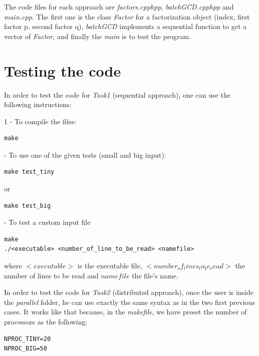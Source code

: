 \documentclass[a4paper,12pt]{article}
\begin{document}
The code files for each approach are \textit{factors.cpp\/hpp}, \textit{batchGCD.cpp\/hpp} and \textit{main.cpp}. The first one is the class \textit{Factor} for a factorization object (index, first factor p, second factor q), \textit{batchGCD} implements a sequential function to get a vector of \textit{Factor}, and finally the \textit{main} is to test the program. 

\section{Testing the code}
In order to test the code for \textit{Task1} (sequential approach), one can use the following instructions:
\vspace{0.5em}

\lstset{language=Pascal}    

1 - To compile the files:
\begin{lstlisting}[frame=single]
make
\end{lstlisting}

 - To use one of the given tests (small and big input):
\begin{lstlisting}[frame=single]
make test_tiny
\end{lstlisting}
or
\begin{lstlisting}[frame=single]
make test_big
\end{lstlisting}
- To test a custom input file
\begin{lstlisting}[frame=single]
make
./<executable> <number_of_line_to_be_read> <namefile>
\end{lstlisting}
\newline

where $<executable>$ is the executable file, $<number_of_lines_to_be_read>$ the number of lines to be read and $namefile$ the file's name.


In order to test the code for \textit{Task2} (distributed approach), once the user is inside the \textit{parallel} folder, he can use exactly the same syntax as in the two first previous cases. It works like that because, in the \textit{makefile}, we have preset the number of processors as the following:
\vspace{0.5em}

\lstset{language=Pascal}    
\begin{lstlisting}[frame=single]
NPROC_TINY=20
NPROC_BIG=50
\end{lstlisting}
\end{document}
